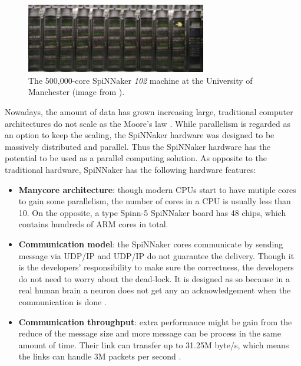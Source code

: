 \begin{figure}[!tb]
   \centering
       \includegraphics[width=0.7\textwidth]{figures/cluster.png}
       \caption{The 500,000-core SpiNNaker \textit{102} machine at the University of Manchester (image from \cite{spinn-core}).}
       \label{fig:cluster}
\end{figure}


Nowadays, the amount of data has grown increasing large, traditional computer architectures do not scale as the Moore's law \cite{schaller1997moore}. While parallelism is regarded as an option to keep the scaling, the SpiNNaker hardware was designed to be massively distributed and parallel. Thus the SpiNNaker hardware has the potential to be used as a parallel computing solution. As opposite to the traditional hardware, SpiNNaker has the following hardware features:

\begin{itemize}
\item \textbf{Manycore architecture}: though modern CPUs start to have mutiple cores to gain some parallelism, the number of cores in a CPU is usually less than 10. On the opposite, a type Spinn-5 SpiNNaker board has 48 chips, which contains hundreds of ARM cores \cite{5th-summit} in total.

\item \textbf{Communication model}: the SpiNNaker cores communicate by sending message via UDP/IP \cite{ws6} and UDP/IP do not guarantee the delivery. Though it is the developers' responsibility to make sure the correctness, the developers do not need to worry about the dead-lock. It is designed as so because in a real human brain a neuron does not get any an acknowledgement when the communication is done \cite{spinnaker}.

\item \textbf{Communication throughput}: extra performance might be gain from the reduce of the message size and more message can be process in the same amount of time\cite{furber2012overview}. Their link can transfer up to 31.25M byte/s, which means the links can handle 3M packets per second \cite{ws6}.\\
\end{itemize}

